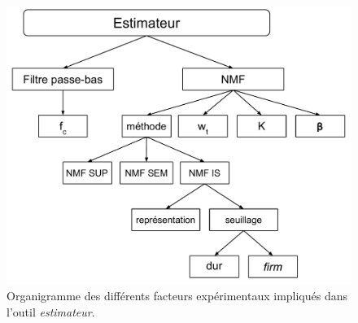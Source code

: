 \begin{figure}[h]
\centering
\includegraphics[width=0.8\linewidth]{./figures/NMF/facteurs_exp.pdf}
\caption{Organigramme des différents facteurs expérimentaux impliqués dans l'outil \textit{estimateur}.}
\label{fig:organigramme}
\end{figure}

